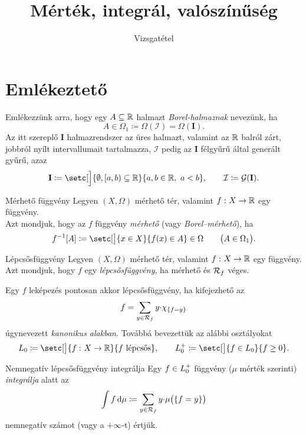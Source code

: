 \documentclass[
]{elteikthesis}[2024/04/26]
\title{Mérték, integrál, valószínűség} %
\subtitle{\circled{14} Vizsgatétel}
\begin{document}
	
	
	\section{Emlékeztető}
	
	Emlékezzünk arra, hogy egy \( A \subseteq \mathbb{R} \) halmazt \emph{Borel-halmaznak} nevezünk, ha
	\[
		A \in \Omega_1 \coloneq \Omega( \mathcal{I} ) = \Omega( \mathbf{I} ).
	\]
	Az itt szereplő \( \mathbf{I} \) halmazrendszer az üres halmazt, 
	valamint az \( \mathbb{R} \) balról zárt, jobbról nyílt intervallumait tartalmazza,
	\( \mathcal{I} \) pedig az \( \mathbf{I} \) félgyűrű által generált gyűrű, azaz
	\[
		\mathbf{I} \coloneq 
		\setc[\Big]{ \emptyset, [a, b) \subseteq \R }{ a, b \in \R, \ a < b }, \qquad
		\mathcal{I} \coloneq
		\mathcal{G}( \mathbf{I} ).
	\]
	\begin{definition}{Mérhető függvény}{}	
		Legyen \( (X, \Omega) \) mérhető tér, valamint \( f \,\colon X \to \mathbb{R} \) egy függvény.\\[6pt]
		Azt mondjuk, hogy az \( f \) függvény \emph{mérhető} (vagy \emph{Borel--mérhető}), ha
		\[
			f^{-1}[A] \coloneq
			\setc[\big]{ x \in X }{ f(x) \in A } \in \Omega
			\qquad \bigl( A \in \Omega_1 \bigr).
		\]
	\end{definition}
	
	\begin{definition}{Lépcsősfüggvény}{}
		Legyen \( (X, \Omega) \) mérhető tér, valamint \( f \,\colon X \to \mathbb{R} \) egy függvény.\\[6pt]
		Azt mondjuk, hogy \( f \) egy \emph{lépcsősfüggvény}, 
		ha mérhető és \( \mathcal{R}_{f} \) véges.
	\end{definition}
	
	\vspace{6pt}
	\noindent
	Egy \( f \) leképezés pontosan akkor lépcsősfüggvény, ha kifejezhető az
	\[
		f = \sum_{y \in \mathcal{R}_{f}} y {\cdot} \chi_{\{ f = y \}}
	\]
	úgynevezett \emph{kanonikus alakban}. Továbbá bevezettük az alábbi osztályokat
	\[
		\StepFunc \coloneq \setc[\big]{ \func{f}{X}{\R} }{ f \text{ lépcsős}}, \qquad
		\StepFuncPos \coloneq \setc[\big]{ f \in \StepFunc }{ f \geq 0 }. 
	\]
	
	\begin{definition}{Nemnegatív lépcsősfüggvény integrálja}{}
		Egy \( f \in \StepFuncPos \) függvény (\( \mu \) mérték szerinti) \emph{integrálja} alatt az
		\[
		\int f \mathop{}\!\mathrm{d}{\mu} \coloneq
		\sum_{y \in \mathcal{R}_{f}} y {\cdot} \mu \bigl( \{ f = y \} \bigr)
		\]
		nemnegatív számot (vagy a \( +\infty \)-t) értjük.
	\end{definition}
	
\end{document}
